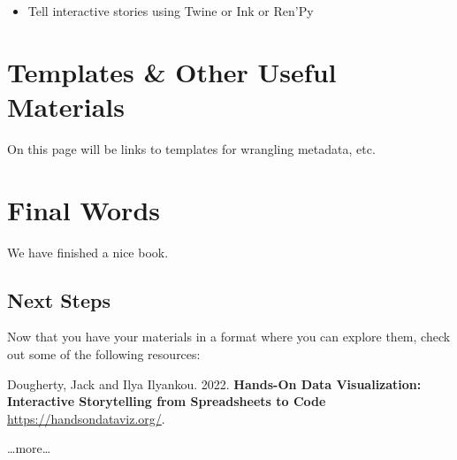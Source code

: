 \documentclass[
]{book}
\providecommand{\tightlist}{%
  \setlength{\itemsep}{0pt}\setlength{\parskip}{0pt}}
\begin{document}
\begin{itemize}
\tightlist
\item
  Tell interactive stories using Twine or Ink or Ren'Py
\end{itemize}

\hypertarget{templates}{%
\chapter{Templates \& Other Useful Materials}\label{templates}}

On this page will be links to templates for wrangling metadata, etc.

\hypertarget{final-words}{%
\chapter{Final Words}\label{final-words}}

We have finished a nice book.

\hypertarget{next-steps}{%
\section{Next Steps}\label{next-steps}}

Now that you have your materials in a format where you can explore them, check out some of the following resources:

Dougherty, Jack and Ilya Ilyankou. 2022. \textbf{Hands-On Data Visualization: Interactive Storytelling from Spreadsheets to Code} \url{https://handsondataviz.org/}.

\ldots more\ldots{}

  
\end{document}

